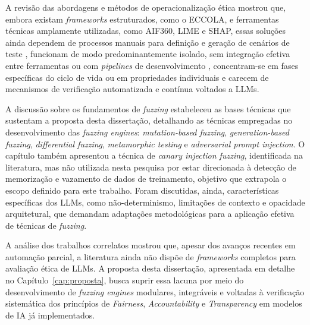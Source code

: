 A revisão das abordagens e métodos de operacionalização ética mostrou que, embora existam \textit{frameworks} estruturados, como o ECCOLA, e ferramentas técnicas amplamente utilizadas, como AIF360, LIME e SHAP, essas soluções ainda dependem de processos manuais para definição e geração de cenários de teste \cite{S005}, funcionam de modo predominantemente isolado, sem integração efetiva entre ferramentas ou com \textit{pipelines} de desenvolvimento \cite{S046}, concentram-se em fases específicas do ciclo de vida ou em propriedades individuais \cite{Monjezi2024} e carecem de mecanismos de verificação automatizada e contínua voltados a LLMs.

A discussão sobre os fundamentos de \textit{fuzzing} estabeleceu as bases técnicas que sustentam a proposta desta dissertação, detalhando as técnicas empregadas no desenvolvimento das \textit{fuzzing engines}: \textit{mutation-based fuzzing}, \textit{generation-based fuzzing}, \textit{differential fuzzing}, \textit{metamorphic testing} e \textit{adversarial prompt injection}. O capítulo também apresentou a técnica de \textit{canary injection fuzzing}, identificada na literatura, mas não utilizada nesta pesquisa por estar direcionada à detecção de memorização e vazamento de dados de treinamento, objetivo que extrapola o escopo definido para este trabalho. Foram discutidas, ainda, características específicas dos LLMs, como não-determinismo, limitações de contexto e opacidade arquitetural, que demandam adaptações metodológicas para a aplicação efetiva de técnicas de \textit{fuzzing}.

A análise dos trabalhos correlatos mostrou que, apesar dos avanços recentes em automação parcial, a literatura ainda não dispõe de \textit{frameworks} completos para avaliação ética de LLMs. A proposta desta dissertação, apresentada em detalhe no Capítulo~\ref{cap:proposta}, busca suprir essa lacuna por meio do desenvolvimento de \textit{fuzzing engines} modulares, integráveis e voltadas à verificação sistemática dos princípios de \textit{Fairness}, \textit{Accountability} e \textit{Transparency} em modelos de IA já implementados.